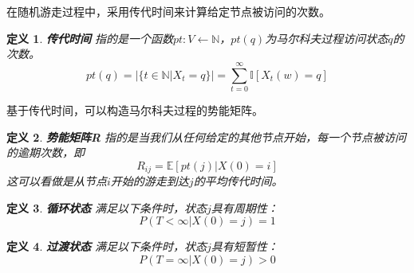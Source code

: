 \documentclass{ctexart}
\newtheorem{Definition}{\hspace{2em}定义}[section]
\begin{document}
                在随机游走过程中，采用传代时间来计算给定节点被访问的次数。
                \begin{Definition}
                    \textbf{传代时间} 指的是一个函数$pt:V\leftarrow \mathbb{N}$，$pt(q)$为马尔科夫过程访问状态$q$的次数。
                    $$
                        pt(q) = |\{t\in\mathbb{N}|X_t=q\}| = \sum_{t=0}^{\infty} \mathbb{I}[X_t(w)=q]
                    $$
                \end{Definition}
                基于传代时间，可以构造马尔科夫过程的势能矩阵。
                \begin{Definition}
                    \textbf{势能矩阵R} 指的是当我们从任何给定的其他节点开始，每一个节点被访问的逾期次数，即
                    $$
                        R_{ij} = \mathbb{E}[pt(j)|X(0)=i]
                    $$
                    这可以看做是从节点$i$开始的游走到达$j$的平均传代时间。
                \end{Definition}
                \begin{Definition}
                    \textbf{循环状态} 满足以下条件时，状态$j$具有周期性：
                        $$
                            P(T<\infty|X(0)=j) = 1
                        $$
                \end{Definition}
                \begin{Definition}
                    \textbf{过渡状态} 满足以下条件时，状态$j$具有短暂性：
                    $$
                        P(T=\infty|X(0)=j) > 0
                    $$
                \end{Definition}
\end{document}

